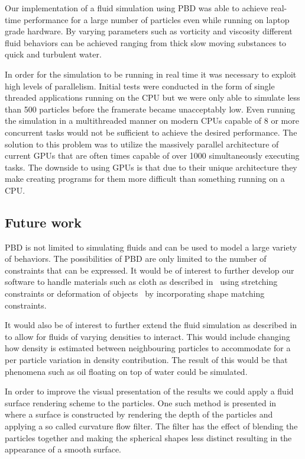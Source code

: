 Our implementation of a fluid simulation using PBD was able
to achieve real-time performance for a large number of particles even while
running on laptop grade hardware. By varying parameters such as vorticity and
viscosity different fluid behaviors can be achieved ranging from thick slow
moving substances to quick and turbulent water.

In order for the simulation to be running in real time it was necessary to
exploit high levels of parallelism. Initial tests were conducted in the form
of single threaded applications running on the CPU but we were only able to
simulate less than 500 particles before the framerate became unacceptably low.
Even running the simulation in a multithreaded manner on modern CPUs capable of
8 or more concurrent tasks would not be sufficient to achieve the desired
performance. The solution to this problem was to utilize the massively parallel
architecture of current GPUs that are often times
capable of over 1000 simultaneously executing tasks. The downside to using GPUs
is that due to their unique architecture they make creating programs for them
more difficult than something running on a CPU.

\subsection{Future work}
PBD is not limited to simulating
fluids and can be used to model a large variety of behaviors. The possibilities
of PBD are only limited to the number of constraints that
can be expressed. It would be of interest to further develop our software to
handle materials such as cloth as described in~\cite{muller2007position} using
stretching constraints or deformation of objects~\cite{muller2005meshless} by
incorporating shape matching constraints.

It would also be of interest to further extend the fluid simulation as
described in~\cite{macklin2014unified} to allow for fluids of varying densities
to interact. This would include changing how density is estimated between
neighbouring particles to accommodate for a per particle variation in density
contribution. The result of this would be that phenomena such as oil floating
on top of water could be simulated.

In order to improve the visual presentation of the results we could apply a
fluid surface rendering scheme to the particles. One such method is presented
in~\cite{van2009screen} where a surface is constructed by rendering the depth
of the particles and applying a so called curvature flow filter. The filter has
the effect of blending the particles together and making the spherical shapes
less distinct resulting in the appearance of a smooth surface.
